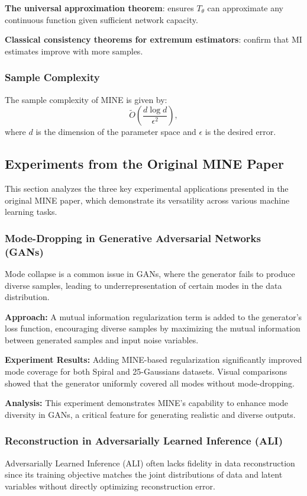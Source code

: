\documentclass[lettersize,journal]{IEEEtran}
\begin{document}
\textbf{The universal approximation theorem}: ensures \( T_\theta \) can approximate any continuous function given sufficient network capacity.

\textbf{Classical consistency theorems for extremum estimators}: confirm that MI estimates improve with more samples.

\subsubsection{Sample Complexity}
The sample complexity of MINE is given by:
\begin{equation}
\tilde{O}\left(\frac{d \log d}{\epsilon^2}\right),
\end{equation}
where \( d \) is the dimension of the parameter space and \( \epsilon \) is the desired error.

\subsection{Experiments from the Original MINE Paper}
This section analyzes the three key experimental applications presented in the original MINE paper, which demonstrate its versatility across various machine learning tasks.

\subsubsection{Mode-Dropping in Generative Adversarial Networks (GANs)}
Mode collapse is a common issue in GANs, where the generator fails to produce diverse samples, leading to underrepresentation of certain modes in the data distribution.

\textbf{Approach:} A mutual information regularization term is added to the generator's loss function, encouraging diverse samples by maximizing the mutual information between generated samples and input noise variables.

\textbf{Experiment Results:} 
Adding MINE-based regularization significantly improved mode coverage for both Spiral and 25-Gaussians datasets. Visual comparisons showed that the generator uniformly covered all modes without mode-dropping.

\textbf{Analysis:} 
This experiment demonstrates MINE's capability to enhance mode diversity in GANs, a critical feature for generating realistic and diverse outputs.

\subsubsection{Reconstruction in Adversarially Learned Inference (ALI)}
Adversarially Learned Inference (ALI) often lacks fidelity in data reconstruction since its training objective matches the joint distributions of data and latent variables without directly optimizing reconstruction error.
\end{document}
